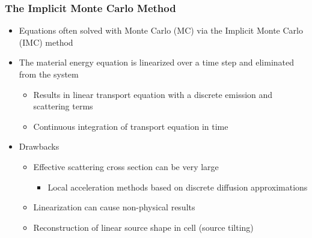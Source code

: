 \documentclass[xcolor=dvipsnames,hyperref={pdfpagelabels=false},unknownkeysallowed]{beamer}
\newlength{\wideitemsep}
\let\olditem\item
\renewcommand{\item}{\setlength{\itemsep}{\wideitemsep}\olditem}
\begin{document}
\begin{frame}
\frametitle{The Implicit Monte Carlo Method}
\begin{itemize}
\item Equations often solved with Monte Carlo (MC) via the Implicit Monte Carlo (IMC) method
\item The material energy equation is linearized over a time step and eliminated from the system
    \begin{itemize}
        \item Results in linear transport equation with a discrete emission and scattering terms
\item Continuous integration of transport equation in time
    \end{itemize}
    \pause
\item Drawbacks 
\begin{itemize}
\item Effective scattering cross section can be very large 
    \begin{itemize}
        \item Local acceleration methods based on discrete diffusion approximations
    \end{itemize}
\item Linearization can cause non-physical results
\item Reconstruction of linear source shape in cell (source tilting)
\end{itemize}
\end{itemize}
\end{frame}
\end{document}

